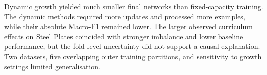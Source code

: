 \documentclass[conference,10pt]{IEEEtran}
\begin{document}
Dynamic growth yielded much smaller final networks than fixed-capacity training. The dynamic methods required more updates and processed more examples, while their absolute Macro-F1 remained lower. The larger observed curriculum effects on Steel Plates coincided with stronger imbalance and lower baseline performance, but the fold-level uncertainty did not support a causal explanation. Two datasets, five overlapping outer training partitions, and sensitivity to growth settings limited generalisation.


\setlength{\emergencystretch}{3em}\sloppy

\end{document}

